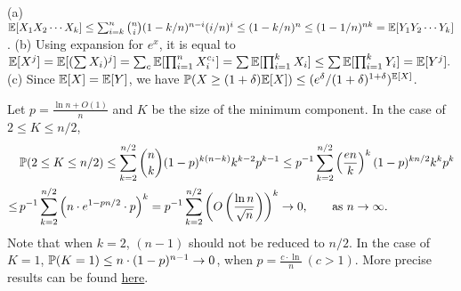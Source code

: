 \documentclass[main.tex]{subfiles}
\begin{document}
 (a) $\mathbb{E}[X_1X_2\cdots X_k]\le\sum_{i=k}^{n}\binom n i (1-k/n)^{n-i}(i/n)^{i}\le(1-k/n)^n\le(1-1/n)^{nk}=\mathbb{E}[Y_1Y_2\cdots Y_k]$. (b) Using expansion for $e^x$, it is equal to $\mathbb{E}[X^j]=\mathbb{E}[(\sum X_i)^j]=\sum_c\mathbb{E}[\prod_{i=1}^{n}X_i^{c_i}]=\sum\mathbb{E}[\prod_{i=1}^{k}X_i]\le\sum\mathbb{E}[\prod_{i=1}^{k}Y_i]=\mathbb{E}[Y^j].$
(c) Since $\mathbb{E}[X]=\mathbb{E}[Y]$, we have $\mathbb{P}(X\ge (1+\delta)\mathbb{E}[X])\le (e^\delta/(1+\delta)^{1+\delta})^{\mathbb{E}[X]}$.

 Let $p = \frac{\ln n+O(1)}{n}$ and $K$ be the size of the minimum component. In the case of  $2\le K\le n/2$,
\[
	\begin{split}
		&\mathbb{P}(2\le K\le n/2)\le\sum_{k=2}^{n/2}\binom{n}{k}(1-p)^{k(n-k)}k^{k-2}p^{k-1}\le p^{-1}\sum_{k=2}^{n/2}\left(\frac{en}{k}\right)^k(1-p)^{kn/2}k^kp^k\\
		\le\,&p^{-1}\sum_{k=2}^{n/2}\left(n\cdot e^{1-pn/2}\cdot p\right)^k=p^{-1}\sum_{k=2}^{n/2}\left(O\left(\frac{\ln n}{\sqrt n}\right)\right)^k \rightarrow 0,\qquad \text{as } n\rightarrow\infty.
	\end{split}
\]
Note that when $k=2$, $(n-1)$ should not be reduced to $n/2$. In the case of $K=1$, $\mathbb{P}(K=1)\le n\cdot(1-p)^{n-1}\rightarrow 0$, when $p=\frac{c\cdot \ln}{n}\,(c>1)$. More precise results can be found \href{https://www.math.cmu.edu/~af1p/MAA2005/L2.pdf}{here}.
\end{document}

